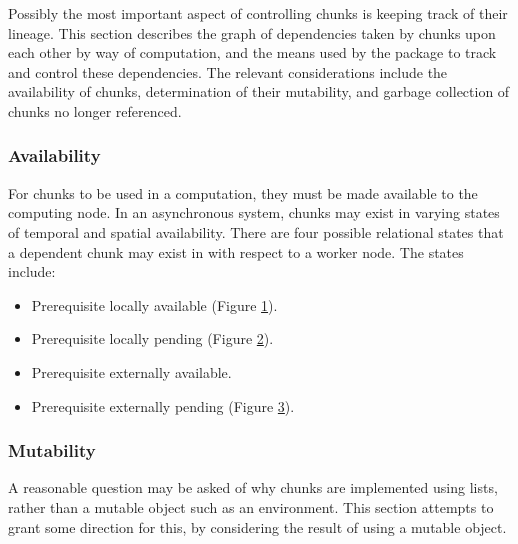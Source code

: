 Possibly the most important aspect of controlling chunks is keeping track of their lineage.
This section describes the graph of dependencies taken by chunks upon each other by way of computation, and the means used by the  package to track and control these dependencies.
The relevant considerations include the availability of chunks, determination of their mutability, and garbage collection of chunks no longer referenced.

\subsubsection{Availability}

For chunks to be used in a computation, they must be made available to the computing node.
In an asynchronous system, chunks may exist in varying states of temporal and spatial availability.
There are four possible relational states that a dependent chunk may exist in with respect to a worker node.
The states include:

\begin{itemize}
\item Prerequisite locally available (Figure \ref{fig:comm-la}).
\item Prerequisite locally pending (Figure \ref{fig:comm-lp}).
\item Prerequisite externally available.
\item Prerequisite externally pending (Figure \ref{fig:comm-ep}).
\end{itemize}

\begin{figure}

\label{fig:comm-la}
\end{figure}

\begin{figure}

\label{fig:comm-lp}
\end{figure}

\begin{figure}

\label{fig:comm-ep}
\end{figure}

\subsubsection{Mutability}

A reasonable question may be asked of why chunks are implemented using lists, rather than a mutable object such as an environment.
This section attempts to grant some direction for this, by considering the result of using a mutable object.

